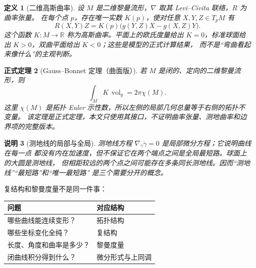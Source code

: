 \documentclass[UTF8,fontset=none,a4paper,11pt]{ctexart}
\theoremstyle{foundation-definition}
\newtheorem{definition}{定义}[section]
\theoremstyle{foundation-theorem}
\newtheorem{theorem}[definition]{正式定理}
\theoremstyle{foundation-proposition}
\theoremstyle{foundation-example}
\theoremstyle{foundation-remark}
\newtheorem{remark}[definition]{说明}
\theoremstyle{foundation-theorem}
\begin{document}
\begin{definition}[二维高斯曲率]\label{def:gaussian-curvature}
设 \(M\) 是二维黎曼流形，\(\nabla\) 取其 Levi--Civita 联络，\(R\) 为曲率张量。
在每个点 \(p\)，存在唯一实数 \(K(p)\)，使对任意
\(X,Y,Z\in T_pM\) 有
\[
R(X,Y)Z
=K(p)\bigl(g(Y,Z)X-g(X,Z)Y\bigr).
\]
这个函数 \(K:M\to\mathbb R\) 称为高斯曲率。平面上的欧氏度量给出
\(K=0\)，标准球面给出 \(K>0\)，双曲平面给出 \(K<0\)；这些是模型的正式计算结果，
而不是“弯曲看起来像什么”的主观判断。
\end{definition}

\begin{theorem}[Gauss--Bonnet 定理（曲面版）]
若 \(M\) 是闭的、定向的二维黎曼流形，则
\[
\int_M K\,\operatorname{vol}_g=2\pi\chi(M).
\]
这里 \(\chi(M)\) 是拓扑 Euler 示性数，所以左侧的局部几何总量等于右侧的拓扑不变量。
该定理是正式定理，本文只使用其接口，不证明曲率张量、测地曲率和边界项的完整版本。
\end{theorem}

\begin{remark}[测地线的局部与全局]
测地线方程 \(\nabla_{\dot\gamma}\dot\gamma=0\) 是局部微分方程；它说明曲线在每一点
都没有内在加速度，但不保证它在两个端点之间是全局最短路。球面上的大圆是测地线，
但相距较远的两个点之间可能存在多条同长测地线。因而“测地线”“最短路”和“唯一最短路”
是三个需要分开的概念。
\end{remark}

复结构和黎曼度量不是同一件事：

\begin{center}
\begin{tabularx}{\textwidth}{>{\ttfamily}lX}
\toprule
问题 & 对应结构 \\
\midrule
哪些曲线能连续变形？ & 拓扑结构 \\
哪些坐标变化全纯？ & 复结构 \\
长度、角度和曲率是多少？ & 黎曼度量 \\
闭曲线积分得到什么？ & 微分形式与上同调 \\
\bottomrule
\end{tabularx}
\end{center}
\end{document}
